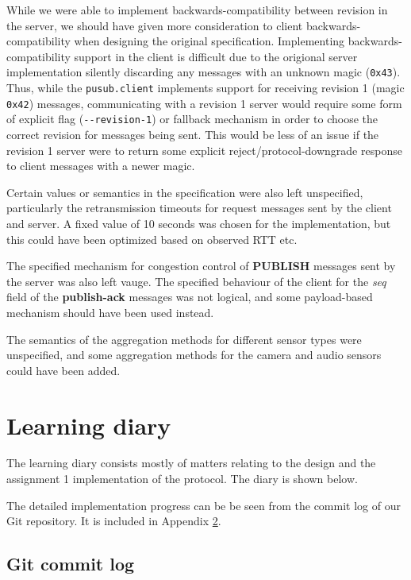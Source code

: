 \documentclass[a4paper]{article}
\begin{document}
While we were able to implement backwards-compatibility between revision in the server, we should have given more consideration to client backwards-compatibility when designing the original specification.
Implementing backwards-compatibility support in the client is difficult due to the origional server implementation silently discarding any messages with an unknown magic (\texttt{0x43}).
Thus, while the \texttt{pusub.client} implements support for receiving revision 1 (magic \texttt{0x42}) messages, communicating with a revision 1 server would require some form of explicit flag (\texttt{\--\--revision-1}) or fallback mechanism in order to choose the correct revision for messages being sent.
This would be less of an issue if the revision 1 server were to return some explicit reject/protocol-downgrade response to client messages with a newer magic.

Certain values or semantics in the specification were also left unspecified, particularly the retransmission timeouts for request messages sent by the client and server. A fixed value of 10 seconds was chosen for the implementation, but this could have been optimized based on observed RTT etc.

The specified mechanism for congestion control of \textbf{PUBLISH} messages sent by the server was also left vauge.
The specified behaviour of the client for the \textit{seq} field of the \textbf{publish-ack} messages was not logical, and some payload-based mechanism should have been used instead.

The semantics of the aggregation methods for different sensor types were unspecified, and some aggregation methods for the camera and audio sensors could have been added. 

\section{Learning diary}
The learning diary consists mostly of matters relating to the design and the
assignment 1 implementation of the protocol. The diary is shown below.

The detailed implementation progress can be be seen from the commit log of our
Git repository. It is included in Appendix \ref{lst:commit_log}.



\clearpage
\begin{appendices}
  \section{Git commit log}\label{lst:commit_log}
  
\end{appendices}
\end{document}
